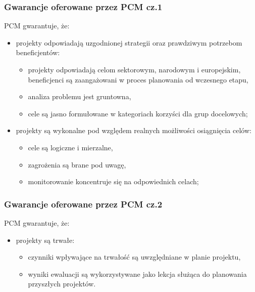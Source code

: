 \documentclass{beamer}
\begin{document}
\begin{frame}\frametitle{Gwarancje oferowane przez PCM cz.1}
    \begin{exampleblock}{PCM gwarantuje, że:}
    \begin{itemize}
        \item projekty odpowiadają uzgodnionej strategii oraz prawdziwym potrzebom beneficjentów: 
        \begin{itemize}
            \item projekty odpowiadają celom sektorowym, narodowym i europejskim, 
            beneficjenci są zaangażowani w proces planowania od wczesnego etapu,
            \item analiza problemu jest gruntowna, 
            \item cele są jasno formułowane w kategoriach korzyści dla grup docelowych; 
        \end{itemize}
        \item projekty są wykonalne pod względem realnych możliwości osiągnięcia celów: 
        \begin{itemize}
            \item cele są logiczne i mierzalne, 
            \item zagrożenia są brane pod uwagę, 
            \item monitorowanie koncentruje się na odpowiednich celach;
        \end{itemize}
    \end{itemize}

 


    \end{exampleblock}
\end{frame}

\begin{frame}\frametitle{Gwarancje oferowane przez PCM cz.2}
    \begin{exampleblock}{PCM gwarantuje, że:}
    \begin{itemize}
        \item projekty są trwałe: 
        \begin{itemize}
            \item czynniki wpływające na trwałość są uwzględniane w planie projektu,
            \item wyniki ewaluacji są wykorzystywane jako lekcja służąca do planowania przyszłych projektów.
        \end{itemize}
    \end{itemize}
    \end{exampleblock}
\end{frame}
\end{document}
